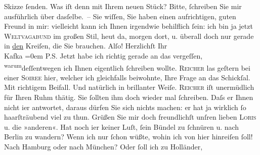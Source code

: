 \begin{ledgroupsized}[t]{13cm}
               Skizze ſenden.\pend
           \pstart
           Was iſt denn mit Ihrem neuen Stück? Bitte, ſchreiben Sie mir ausführlich über
               dasſelbe. – Sie wiſſen, Sie haben einen aufrichtigen, guten Freund in mir: vielleicht
               kann ich Ihnen irgendwie behilflich ſein: ich bin ja jetzt \textsc{Weltvagabund} im großen Stil, heut da, morgen dort, u. überall doch nur
               gerade in \uline{den} Kreiſen, die Sie brauchen. Alſo!\pend
           \pstart
           Herzlichſt Ihr{\\[\baselineskip]}\spacefill\mbox{Kafka}\pend
           \leftskip=0em{}\pstart
           \noindent{}{\pb}\textsc{P.S.}\pend
           \pstart
           Jetzt habe ich richtig gerade an das vergeſſen, \substVorne{}\textsuperscript{warum}\substDazwischen{}deſſentwegen\substHinten{} ich Ihnen eigentlich ſchreiben wollte.\pend
           \pstart
           \textsc{Reicher} las geſtern bei einer \textsc{Soiree} hier, welcher ich
                  gleichfalls beiwohnte, Ihre Frage an das
                     Schickſal. Mit richtigem Beifall. Und natürlich in brillanter Weiſe. \textsc{Reicher} iſt unermüdlich für Ihren Ruhm thätig. Sie ſollten ihm doch wieder mal
                  ſchreiben. {\pb}Daſs er Ihnen nicht i{\geminationm}er antwortet, daraus dürfen Sie sich nichts machen:
                  er hat ja wirklich ſo haarſträubend viel zu thun.\pend
           \pstart
           Grüßen Sie mir doch freundlichſt unſren lieben \textsc{Loris} u. die »anderen«. Hat noch i{\geminationm}er keiner Luſt,
                  ſein Bündel zu ſchnüren u. nach Berlin zu
                  wandern?\pend
           \pstart
           Wenn ich nur ſchon wüßte, wohin ich von hier hinreiſen ſoll! Nach Hamburg oder nach München? Oder ſoll ich zu Holländer,

\end{ledgroupsized}
